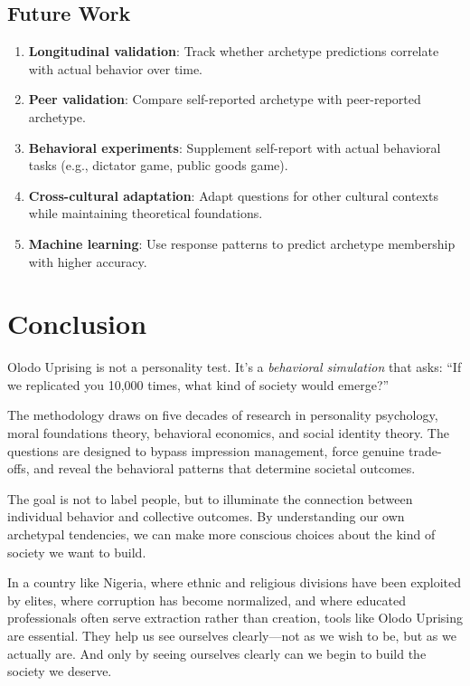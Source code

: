 \documentclass[11pt,a4paper]{article}
\begin{document}
\subsection{Future Work}

\begin{enumerate}[leftmargin=*]
    \item \textbf{Longitudinal validation}: Track whether archetype predictions correlate with actual behavior over time.
    
    \item \textbf{Peer validation}: Compare self-reported archetype with peer-reported archetype.
    
    \item \textbf{Behavioral experiments}: Supplement self-report with actual behavioral tasks (e.g., dictator game, public goods game).
    
    \item \textbf{Cross-cultural adaptation}: Adapt questions for other cultural contexts while maintaining theoretical foundations.
    
    \item \textbf{Machine learning}: Use response patterns to predict archetype membership with higher accuracy.
\end{enumerate}

\section{Conclusion}

Olodo Uprising is not a personality test. It's a \textit{behavioral simulation} that asks: ``If we replicated you 10,000 times, what kind of society would emerge?''

The methodology draws on five decades of research in personality psychology, moral foundations theory, behavioral economics, and social identity theory. The questions are designed to bypass impression management, force genuine trade-offs, and reveal the behavioral patterns that determine societal outcomes.

The goal is not to label people, but to illuminate the connection between individual behavior and collective outcomes. By understanding our own archetypal tendencies, we can make more conscious choices about the kind of society we want to build.

In a country like Nigeria, where ethnic and religious divisions have been exploited by elites, where corruption has become normalized, and where educated professionals often serve extraction rather than creation, tools like Olodo Uprising are essential. They help us see ourselves clearly—not as we wish to be, but as we actually are. And only by seeing ourselves clearly can we begin to build the society we deserve.
\end{document}

